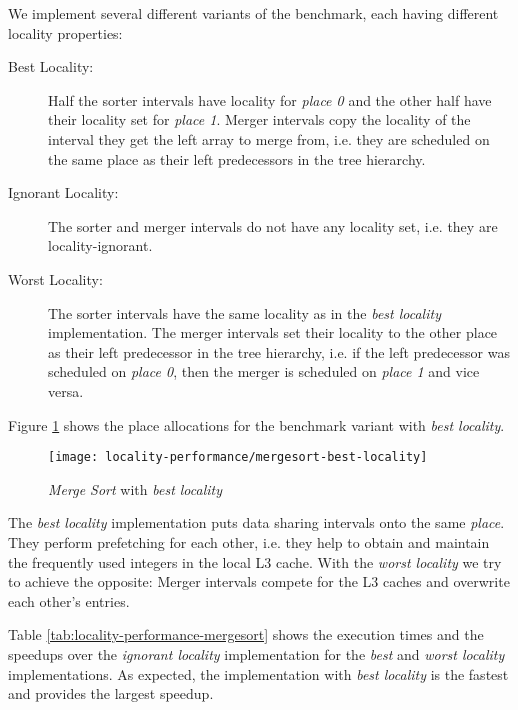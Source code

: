 We implement several different variants of the benchmark, each having
different locality properties:

\begin{description}
\item[Best Locality:] Half the sorter intervals have locality for
  \emph{place 0} and the other half have their locality set for
  \emph{place 1}. Merger intervals copy the locality of the interval
  they get the left array to merge from, i.e. they are scheduled on
  the same place as their left predecessors in the tree hierarchy.
\item[Ignorant Locality:] The sorter and merger intervals do not have
  any locality set, i.e. they are locality-ignorant.
\item[Worst Locality:] The sorter intervals have the same locality as
  in the \emph{best locality} implementation. The merger intervals set
  their locality to the other place as their left predecessor in the
  tree hierarchy, i.e. if the left predecessor was scheduled on
  \emph{place 0}, then the merger is scheduled on \emph{place 1} and
  vice versa.
\end{description}

Figure \ref{fig:locality-performance-mergesort-best-locality} shows
the place allocations for the benchmark variant with \emph{best
  locality}.

\begin{figure}[!ht]
  \centering
  \texttt{[image: locality-performance/mergesort-best-locality]}
  \caption{\emph{Merge Sort} with \emph{best locality}}
  \label{fig:locality-performance-mergesort-best-locality}
\end{figure}

The \emph{best locality} implementation puts data sharing intervals
onto the same \emph{place}. They perform prefetching for each other,
i.e. they help to obtain and maintain the frequently used integers in
the local L3 cache. With the \emph{worst locality} we try to achieve
the opposite: Merger intervals compete for the L3 caches and overwrite
each other's entries.

Table \ref{tab:locality-performance-mergesort} shows the execution
times and the speedups over the \emph{ignorant locality}
implementation for the \emph{best} and \emph{worst locality}
implementations. As expected, the implementation with \emph{best
  locality} is the fastest and provides the largest speedup.

